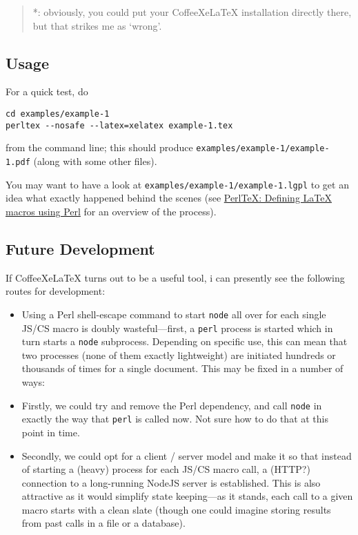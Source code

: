 \begin{quote}
*: obviously, you could put your CoffeeXeLaTeX installation directly
there, but that strikes me as `wrong'.
\end{quote}

\subsection{Usage}\label{usage}

For a quick test, do

\begin{verbatim}
cd examples/example-1
perltex --nosafe --latex=xelatex example-1.tex
\end{verbatim}

from the command line; this should produce
\texttt{examples/example-1/example-1.pdf} (along with some other files).

You may want to have a look at
\texttt{examples/example-1/example-1.lgpl} to get an idea what exactly
happened behind the scenes (see
\href{https://www.tug.org/TUGboat/tb25-2/tb81pakin.pdf}{PerlTeX:
Defining LaTeX macros using Perl} for an overview of the process).

\subsection{Future Development}\label{future-development}

If CoffeeXeLaTeX turns out to be a useful tool, i can presently see the
following routes for development:

\begin{itemize}
\item
  Using a Perl shell-escape command to start \texttt{node} all over for
  each single JS/CS macro is doubly wasteful---first, a \texttt{perl}
  process is started which in turn starts a \texttt{node} subprocess.
  Depending on specific use, this can mean that two processes (none of
  them exactly lightweight) are initiated hundreds or thousands of times
  for a single document. This may be fixed in a number of ways:
\item
  Firstly, we could try and remove the Perl dependency, and call
  \texttt{node} in exactly the way that \texttt{perl} is called now. Not
  sure how to do that at this point in time.
\item
  Secondly, we could opt for a client / server model and make it so that
  instead of starting a (heavy) process for each JS/CS macro call, a
  (HTTP?) connection to a long-running NodeJS server is established.
  This is also attractive as it would simplify state keeping---as it
  stands, each call to a given macro starts with a clean slate (though
  one could imagine storing results from past calls in a file or a
  database).
\end{itemize}

